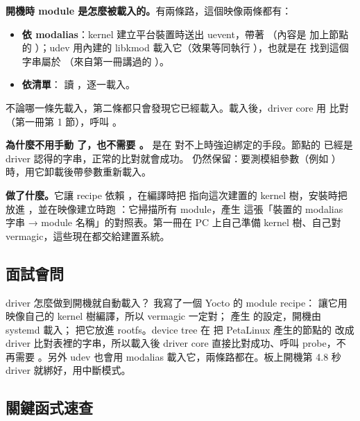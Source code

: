 \textbf{開機時 module 是怎麼被載入的。}有兩條路，這個映像兩條都有：
\begin{itemize}
\item \textbf{依 modalias}：kernel 建立平台裝置時送出 uevent，帶著 （內容是  加上節點的 ）；udev 用內建的 libkmod 載入它（效果等同執行 ），也就是在  找到這個字串屬於 （來自第一冊講過的 ）。
\item \textbf{依清單}： 讀 ，逐一載入。
\end{itemize}
不論哪一條先載入，第二條都只會發現它已經載入。載入後，driver core 用  比對（第一冊第 1 節），呼叫 。

\textbf{為什麼不用手動  了，也不需要 。} 是在  對不上時強迫綁定的手段。節點的  已經是 driver 認得的字串，正常的比對就會成功。 仍然保留：要測模組參數（例如 ）時，用它卸載後帶參數重新載入。

\textbf{ 做了什麼。}它讓 recipe 依賴 ，在編譯時把  指向這次建置的 kernel 樹，安裝時把  放進 ，並在映像建立時跑 ：它掃描所有 module，產生  這張「裝置的 modalias 字串 → module 名稱」的對照表。第一冊在 PC 上自己準備 kernel 樹、自己對 vermagic，這些現在都交給建置系統。

\subsection{面試會問}

\begin{qa}{driver 怎麼做到開機就自動載入？}
我寫了一個 Yocto 的 module recipe： 讓它用映像自己的 kernel 樹編譯，所以 vermagic 一定對； 產生  的設定，開機由 systemd 載入； 把它放進 rootfs。device tree 在  把 PetaLinux 產生的節點的  改成 driver 比對表裡的字串，所以載入後 driver core 直接比對成功、呼叫 probe，不再需要 。另外 udev 也會用 modalias 載入它，兩條路都在。板上開機第 4.8 秒 driver 就綁好，用中斷模式。
\end{qa}

\subsection{關鍵函式速查}

